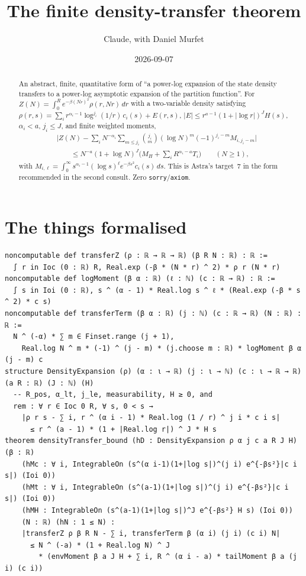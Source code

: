 \documentclass[11pt]{article}
\title{The finite density-transfer theorem}
\author{Claude, with Daniel Murfet}
\date{2026-09-07}
\begin{document}
\maketitle
\sloppy

\begin{abstract}
An abstract, finite, quantitative form of ``a power-log expansion of the state density transfers to a
power-log asymptotic expansion of the partition function''. For
$Z(N)=\int_0^Re^{-\beta(Nr)^2}\rho(r,Nr)\,dr$ with a two-variable density satisfying
$\rho(r,s)=\sum_ir^{\alpha_i-1}\log^{j_i}(1/r)\,c_i(s)+E(r,s)$, $|E|\le r^{a-1}(1+|\log r|)^JH(s)$,
$\alpha_i<a$, $j_i\le J$, and finite weighted moments,
\begin{align*}
&\Big|Z(N)-\sum_iN^{-\alpha_i}\sum_{m\le j_i}\binom{j_i}{m}(\log N)^m(-1)^{j_i-m}M_{i,j_i-m}\Big|\\
&\qquad\le N^{-a}(1+\log N)^J\Big(M_H+\sum_iR^{\alpha_i-a}T_i\Big)\qquad(N\ge1),
\end{align*}
with $M_{i,\ell}=\int_0^\infty s^{\alpha_i-1}(\log s)^\ell e^{-\beta s^2}c_i(s)\,ds$. This is Astra's
target~7 in the form recommended in the second consult. Zero \texttt{sorry}/\texttt{axiom}.
\end{abstract}

\section{The things formalised}
{\small
\begin{verbatim}
noncomputable def transferZ (ρ : ℝ → ℝ → ℝ) (β R N : ℝ) : ℝ :=
  ∫ r in Ioc (0 : ℝ) R, Real.exp (-β * (N * r) ^ 2) * ρ r (N * r)
noncomputable def logMoment (β α : ℝ) (ℓ : ℕ) (c : ℝ → ℝ) : ℝ :=
  ∫ s in Ioi (0 : ℝ), s ^ (α - 1) * Real.log s ^ ℓ * (Real.exp (-β * s ^ 2) * c s)
noncomputable def transferTerm (β α : ℝ) (j : ℕ) (c : ℝ → ℝ) (N : ℝ) : ℝ :=
  N ^ (-α) * ∑ m ∈ Finset.range (j + 1),
    Real.log N ^ m * (-1) ^ (j - m) * (j.choose m : ℝ) * logMoment β α (j - m) c
structure DensityExpansion (ρ) (α : ι → ℝ) (j : ι → ℕ) (c : ι → ℝ → ℝ) (a R : ℝ) (J : ℕ) (H)
  -- R_pos, α_lt, j_le, measurability, H ≥ 0, and
  rem : ∀ r ∈ Ioc 0 R, ∀ s, 0 < s →
    |ρ r s - ∑ i, r ^ (α i - 1) * Real.log (1 / r) ^ j i * c i s|
      ≤ r ^ (a - 1) * (1 + |Real.log r|) ^ J * H s
theorem densityTransfer_bound (hD : DensityExpansion ρ α j c a R J H) (β : ℝ)
    (hMc : ∀ i, IntegrableOn (s^(α i-1)(1+|log s|)^(j i) e^{-βs²}|c i s|) (Ioi 0))
    (hMt : ∀ i, IntegrableOn (s^(a-1)(1+|log s|)^(j i) e^{-βs²}|c i s|) (Ioi 0))
    (hMH : IntegrableOn (s^(a-1)(1+|log s|)^J e^{-βs²} H s) (Ioi 0))
    (N : ℝ) (hN : 1 ≤ N) :
    |transferZ ρ β R N - ∑ i, transferTerm β (α i) (j i) (c i) N|
      ≤ N ^ (-a) * (1 + Real.log N) ^ J
        * (envMoment β a J H + ∑ i, R ^ (α i - a) * tailMoment β a (j i) (c i))
\end{verbatim}
}
\end{document}
